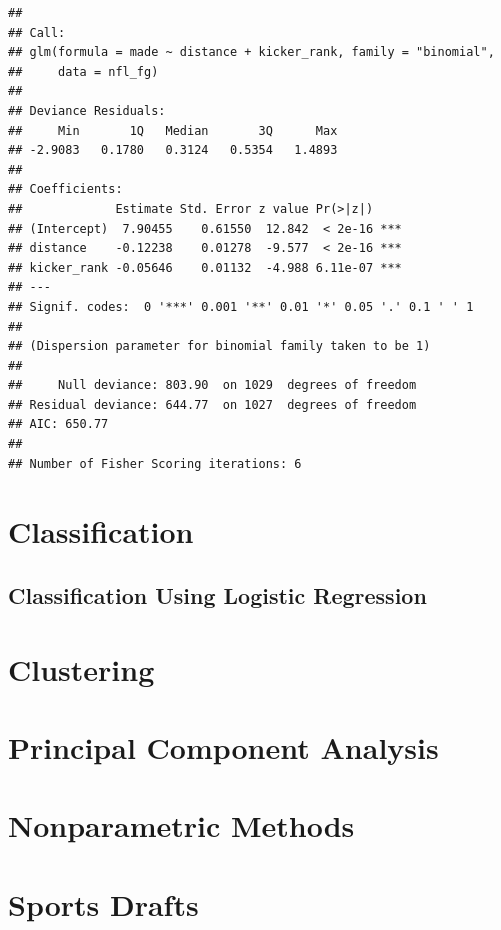 \documentclass[
  11pt,
]{book}
\theoremstyle{definition}
\theoremstyle{definition}
\theoremstyle{definition}
\theoremstyle{definition}
\theoremstyle{remark}
\begin{document}
\begin{verbatim}
## 
## Call:
## glm(formula = made ~ distance + kicker_rank, family = "binomial", 
##     data = nfl_fg)
## 
## Deviance Residuals: 
##     Min       1Q   Median       3Q      Max  
## -2.9083   0.1780   0.3124   0.5354   1.4893  
## 
## Coefficients:
##             Estimate Std. Error z value Pr(>|z|)    
## (Intercept)  7.90455    0.61550  12.842  < 2e-16 ***
## distance    -0.12238    0.01278  -9.577  < 2e-16 ***
## kicker_rank -0.05646    0.01132  -4.988 6.11e-07 ***
## ---
## Signif. codes:  0 '***' 0.001 '**' 0.01 '*' 0.05 '.' 0.1 ' ' 1
## 
## (Dispersion parameter for binomial family taken to be 1)
## 
##     Null deviance: 803.90  on 1029  degrees of freedom
## Residual deviance: 644.77  on 1027  degrees of freedom
## AIC: 650.77
## 
## Number of Fisher Scoring iterations: 6
\end{verbatim}

\hypertarget{classification}{%
\chapter{Classification}\label{classification}}

\hypertarget{classification-using-logistic-regression}{%
\section{Classification Using Logistic Regression}\label{classification-using-logistic-regression}}

\newpage

\hypertarget{clustering}{%
\chapter{Clustering}\label{clustering}}

\hypertarget{principal-component-analysis}{%
\chapter{Principal Component Analysis}\label{principal-component-analysis}}

\hypertarget{nonparametric-methods}{%
\chapter{Nonparametric Methods}\label{nonparametric-methods}}

\hypertarget{sports-drafts}{%
\chapter{Sports Drafts}\label{sports-drafts}}
\end{document}
